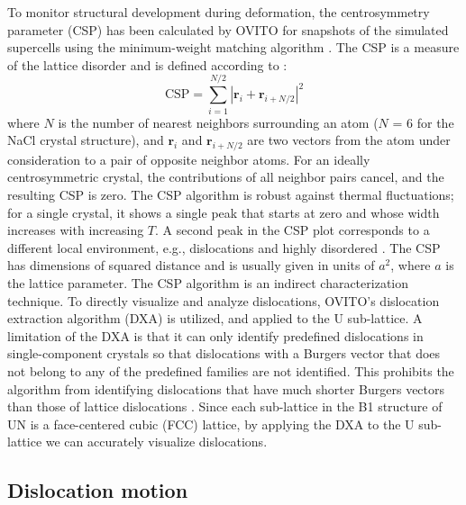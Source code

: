 \documentclass[applsci,article,submit,pdftex,moreauthors]{Definitions/mdpi}
\newcommand{\?}{\stackrel{?}{=}}
\providecommand{\DIFadd}[1]{{\bf #1}} %
\providecommand{\DIFdel}[1]{} %
\providecommand{\DIFaddbegin}{\protect\color{blue}} %
\providecommand{\DIFaddend}{\protect\color{black}} %
\providecommand{\DIFdelbegin}{\protect\color{red}} %
\providecommand{\DIFdelend}{\protect\color{black}} %
\newcommand{\DIFscaledelfig}{0.5}
\newlength{\DIFdelgraphicswidth} %
\newlength{\DIFdelgraphicsheight} %
\newcommand{\DIFaddincludegraphics}[2][]{{\color{blue}\fbox{\DIFOincludegraphics[#1]{#2}}}} %
\newcommand{\DIFdelincludegraphics}[2][]{%
\sbox{\DIFdelgraphicsbox}{\DIFOincludegraphics[#1]{#2}}%
\settoboxwidth{\DIFdelgraphicswidth}{\DIFdelgraphicsbox} %
\settoboxtotalheight{\DIFdelgraphicsheight}{\DIFdelgraphicsbox} %
\scalebox{\DIFscaledelfig}{%
\parbox[b]{\DIFdelgraphicswidth}{\usebox{\DIFdelgraphicsbox}\\[-\baselineskip] \rule{\DIFdelgraphicswidth}{0em}}\llap{\resizebox{\DIFdelgraphicswidth}{\DIFdelgraphicsheight}{%
\setlength{\unitlength}{\DIFdelgraphicswidth}%
\begin{picture}(1,1)%
\thicklines\linethickness{2pt} %
{\color[rgb]{1,0,0}\put(0,0){\framebox(1,1){}}}%
{\color[rgb]{1,0,0}\put(0,0){\line( 1,1){1}}}%
{\color[rgb]{1,0,0}\put(0,1){\line(1,-1){1}}}%
\end{picture}%
}\hspace*{3pt}}} %
} %
\DeclareRobustCommand{\DIFaddbegin}{\DIFOaddbegin \let\includegraphics\DIFaddincludegraphics} %
\DeclareRobustCommand{\DIFaddend}{\DIFOaddend \let\includegraphics\DIFOincludegraphics} %
\DeclareRobustCommand{\DIFdelbegin}{\DIFOdelbegin \let\includegraphics\DIFdelincludegraphics} %
\DeclareRobustCommand{\DIFdelend}{\DIFOaddend \let\includegraphics\DIFOincludegraphics} %
\begin{document}
To monitor structural development during deformation, the centrosymmetry parameter (CSP) has been calculated by OVITO for snapshots of the simulated supercells using the minimum-weight matching algorithm \cite{Larsen2020}. The CSP is a measure of the lattice disorder and is defined according to \cite{Kelchner1998}:
\begin{equation}
\mathrm{CSP} = \sum_{i=1}^{N/2} |\mathbf{r}_i + \mathbf{r}_{i+N/2}|^{2} 
\end{equation}
where $N$ is the number of nearest neighbors surrounding an atom ($N$ = 6 for the NaCl crystal structure), and $\mathbf{r}_i$ and $\mathbf{r}_{i+N/2}$ are two vectors from the atom under consideration to a pair of opposite neighbor atoms. For an ideally centrosymmetric crystal, the contributions of all neighbor pairs cancel, and the resulting CSP is zero. The CSP algorithm is robust against thermal fluctuations; for a single crystal, it shows a single peak that starts at zero and whose width increases with increasing $T$. A second peak in the CSP plot corresponds to a different local environment, e.g., dislocations and highly disordered \DIFdelbegin \DIFdel{GBs }\DIFdelend \DIFaddbegin \DIFadd{grain boundaries (GBs) }\DIFaddend \cite{Bulatov2006, Larsen2020}. The CSP has dimensions of squared distance and is usually given in units of $a^2$, where $a$ is the lattice parameter. The CSP algorithm is an indirect characterization technique. To directly visualize and analyze dislocations, OVITO's dislocation extraction algorithm (DXA) \cite{Stukowski2012} is utilized, and applied to the U sub-lattice. A limitation of the DXA is that it can only identify predefined dislocations in single-component crystals so that dislocations with a Burgers vector that does not belong to any of the predefined families are not identified. This prohibits the algorithm from identifying \DIFdelbegin \DIFdel{grain boundary (GB ) }\DIFdelend \DIFaddbegin \DIFadd{GB }\DIFaddend dislocations that have much shorter Burgers vectors than those of lattice dislocations \cite{Cai2016}. Since each sub-lattice in the B1 structure of UN is a face-centered cubic (FCC) lattice, by applying the DXA to the U sub-lattice we can accurately visualize dislocations. 

\subsection{Dislocation motion}
\end{document}
